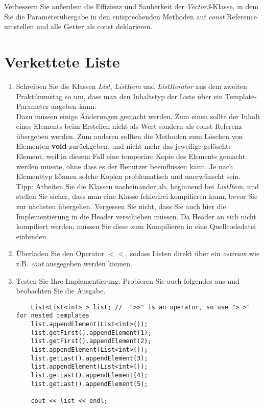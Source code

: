 \documentclass[
  accentcolor=tud1c,	%
  colorbacktitle,		%
  inverttitle,			%
  german,				%
  twoside
]{tudexercise}
\begin{document}
Verbessern Sie außerdem die Effizienz und Sauberkeit der \emph{Vector3}-Klasse, in dem Sie die Parameterübergabe in den entsprechenden Methoden auf \emph{const} Reference umstellen und alle Getter als const deklarieren. 

\section{Verkettete Liste}
\begin{enumerate}
\item Schreiben Sie die Klassen \emph{List}, \emph{ListItem} und \emph{ListIterator} aus dem zweiten Praktikumstag so um, dass man den Inhaltstyp der Liste über ein Template-Parameter angeben kann.\\

Dazu müssen einige Änderungen gemacht werden. Zum einen sollte der Inhalt eines Elements beim Erstellen nicht als Wert sondern als const Referenz übergeben werden. Zum anderen sollten die Methoden zum Löschen von Elementen \textbf{void} zurückgeben, und nicht mehr das jeweilige gelöschte Element, weil in diesem Fall eine temporäre Kopie des Elements gemacht werden müsste, ohne dass es der Benutzer beeinflussen kann. Je nach Elementtyp können solche Kopien problematisch und unerwünscht sein.\\

Tipp: Arbeiten Sie die Klassen nacheinander ab, beginnend bei \emph{ListItem}, und stellen Sie sicher, dass man eine Klasse fehlerfrei kompilieren kann, bevor Sie zur nächsten übergehen. Vergessen Sie nicht, dass Sie auch hier die Implementierung in die Header verschieben müssen. Da Header an sich nicht kompiliert werden, müssen Sie diese zum Kompilieren in eine Quellcodedatei einbinden.\\

\item Überladen Sie den Operator $<<$, sodass Listen direkt über ein \emph{ostream} wie z.B. \emph{cout} ausgegeben werden können. 

\item Testen Sie Ihre Implementierung. Probieren Sie auch folgendes aus und beobachten Sie die Ausgabe.

\begin{lstlisting}
	List<List<int> > list; //  ">>" is an operator, so use "> >" for nested templates
	list.appendElement(List<int>());
	list.getFirst().appendElement(1);
	list.getFirst().appendElement(2);
	list.appendElement(List<int>());
	list.getLast().appendElement(3);
	list.appendElement(List<int>());
	list.getLast().appendElement(4);
	list.getLast().appendElement(5);
	
	cout << list << endl;
\end{lstlisting}
\end{enumerate}
\end{document}
